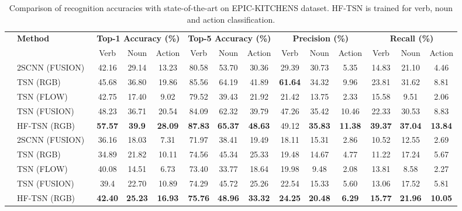 \documentclass[journal,onecolumn]{IEEEtran}
\begin{document}
\begin{table}[t]
	\centering \begin{tabular}{|c|l|c c c|c c c| c c c|c c c|}
		\hline
		& \textbf{Method} & \multicolumn{3}{c|}{\textbf{Top-1 Accuracy (\%)}} & \multicolumn{3}{c|}{\textbf{Top-5 Accuracy (\%)}} & \multicolumn{3}{c|}{\textbf{Precision (\%)}} & \multicolumn{3}{c|}{\textbf{Recall (\%)}} \\
		\cline{3-14}
		& & \parbox{0.7cm}{Verb} & \parbox{0.7cm}{Noun} & \parbox{0.8cm}{Action} & \parbox{0.7cm}{Verb} & \parbox{0.7cm}{Noun} & \parbox{0.8cm}{Action} & \parbox{0.7cm}{Verb} & \parbox{0.7cm}{Noun} & \parbox{0.8cm}{Action} & \parbox{0.7cm}{Verb} & \parbox{0.7cm}{Noun} & \parbox{0.8cm}{Action}\\
		\hline 
		 & 2SCNN (FUSION)~\cite{twoStream} & 42.16 & 29.14 & 13.23 & 80.58 & 53.70 & 30.36 & 29.39 & 30.73 & 5.35 & 14.83 & 21.10 & 4.46\\ 
		& TSN (RGB)~\cite{tsn} & 45.68 & 36.80 & 19.86 & 85.56 & 64.19 & 41.89 & \textbf{61.64} & 34.32 & 9.96 & 23.81 & 31.62 & 8.81\\ 
		& TSN (FLOW)~\cite{tsn} & 42.75 & 17.40 & 9.02 & 79.52 & 39.43 & 21.92 & 21.42 & 13.75 & 2.33 & 15.58 & 9.51 & 2.06\\ 
& TSN (FUSION)~\cite{tsn} & 48.23 & 36.71 & 20.54 & 84.09 & 62.32 & 39.79 & 47.26 & 35.42 & 10.46 & 22.33 & 30.53 & 8.83\\ 
& HF-TSN (RGB) & \textbf{57.57} & \textbf{39.9} & \textbf{28.09} & \textbf{87.83} & \textbf{65.37} & \textbf{48.63} & 49.12 & \textbf{35.83} & \textbf{11.38} & \textbf{39.37} & \textbf{37.04} & \textbf{13.84}\\
		\hline \hline
		 & 2SCNN (FUSION)~\cite{twoStream} & 36.16 & 18.03 & 7.31 & 71.97 & 38.41 & 19.49 & 18.11 & 15.31 & 2.86 & 10.52 & 12.55 & 2.69\\ \cline{2-14}
		& TSN (RGB)~\cite{tsn} & 34.89 & 21.82 & 10.11 & 74.56 & 45.34 & 25.33 & 19.48 & 14.67 & 4.77 & 11.22 & 17.24 & 5.67\\ \cline{2-14}
		& TSN (FLOW)~\cite{tsn} & 40.08 & 14.51 & 6.73 & 73.40 & 33.77 & 18.64 & 19.98 & 9.48 & 2.08 & 13.81 & 8.58 & 2.27 \\ \cline{2-14}
		& TSN (FUSION)~\cite{tsn}& 39.4 & 22.70 & 10.89 & 74.29 & 45.72 & 25.26 & 22.54 & 15.33 & 5.60 & 13.06 & 17.52 & 5.81\\ \cline{2-14}
& HF-TSN (RGB) & \textbf{42.40} & \textbf{25.23} & \textbf{16.93} & \textbf{75.76} & \textbf{48.96} & \textbf{33.32} & \textbf{24.25} & \textbf{20.48} & \textbf{6.29} & \textbf{15.77} & \textbf{21.96} & \textbf{10.05}\\ \hline
	\end{tabular}
	\caption{Comparison of recognition accuracies with state-of-the-art on EPIC-KITCHENS dataset. HF-TSN is trained for verb, noun and action classification.}
	\label{tab:epic_kitchens}

\end{table}
\end{document}
